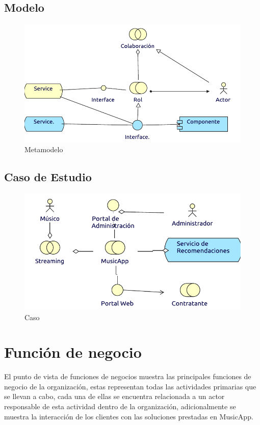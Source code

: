 \subsection{Modelo}
\begin{figure}[h!]
	\centering
	\includegraphics[width=\linewidth]{Arquitectura/Negocio/imgs/cooperacionActorMetaModelo.pdf}
	\caption{Metamodelo}
\end{figure}
\newpage
\subsection{Caso de Estudio}

\begin{figure}[h!]
	\centering
	\includegraphics[width=\linewidth]{Arquitectura/Negocio/imgs/cooperacionActor.pdf}
	\caption{Caso}
\end{figure}
\newpage


\section{Función de negocio}
El punto de vista de funciones de negocios muestra las principales funciones de negocio de la organización, estas representan todas las actividades primarias que se llevan a cabo, cada una de ellas se encuentra relacionada a un actor responsable de esta actividad dentro de la organización, adicionalmente se muestra la interacción de los clientes con las soluciones prestadas en MusicApp.\\

